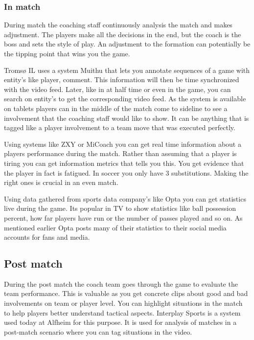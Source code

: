 \subsubsection{In match}

During match the coaching staff continuously analysis the match and makes adjustment. The players make all the decisions in the end, but the coach is the boss and sets the style of play. An adjustment to the formation can potentially be the tipping point that wins you the game.

Tromsø IL uses a system Muithu that lets you annotate sequences of a game with entity's like player, comment. This information will then be time synchronized with the video feed. Later, like in at half time or even in the game, you can search on entity's to get the corresponding video feed. As the system is available on tablets players can in the middle of the match come to sideline to see a involvement that the coaching staff would like to show. It can be anything that is tagged like a player involvement to a team move that was executed perfectly. 

Using systems like ZXY or MiCoach you can get real time information about a players performance during the match. Rather than assuming that a player is tiring you can get information metrics that tells you this. You get evidence that the player in fact is fatigued. In soccer you only have 3 substitutions. Making the right ones is crucial in an even match.

Using data gathered from sports data company's like Opta you can get statistics live during the game. Its popular in TV to show statistics like ball possession percent, how far players have run or the number of passes played and so on. As mentioned earlier Opta posts many of their statistics to their social media accounts for fans and media.

\subsection{Post match}

During the post match the coach team goes through the game to evaluate the team performance. This is valuable as you get concrete clips about good and bad involvements on team or player level. You can highlight situations in the match to help players better understand tactical aspects. Interplay Sports is a system used today at Alfheim for this purpose. It is used for analysis of matches in a post-match scenario where you can tag situations in the video. 

